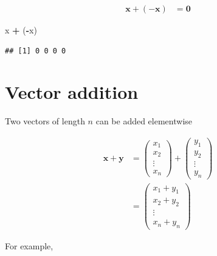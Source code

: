 \documentclass[
]{book}
\newenvironment{Shaded}{\begin{snugshade}}{\end{snugshade}}
\newcommand{\NormalTok}[1]{#1}
\newcommand{\OperatorTok}[1]{\textcolor[rgb]{0.81,0.36,0.00}{\textbf{#1}}}
\newcommand{\StringTok}[1]{\textcolor[rgb]{0.31,0.60,0.02}{#1}}
\theoremstyle{definition}
\theoremstyle{definition}
\theoremstyle{definition}
\theoremstyle{definition}
\theoremstyle{remark}
\begin{document}
\[
\begin{aligned}
\mathbf{x} + (- \mathbf{x}) & = \mathbf{0}
\end{aligned}
\]

\begin{Shaded}
\begin{Highlighting}[]
\NormalTok{x }\OperatorTok{+}\StringTok{ }\NormalTok{(}\OperatorTok{-}\NormalTok{x)}
\end{Highlighting}
\end{Shaded}

\begin{verbatim}
## [1] 0 0 0 0
\end{verbatim}

\hypertarget{vector-addition}{%
\section{Vector addition}\label{vector-addition}}

Two vectors of length \(n\) can be added elementwise

\[
\begin{aligned}
\mathbf{x} + \mathbf{y} & = \begin{pmatrix} x_1 \\ x_2 \\ \vdots \\ x_n \end{pmatrix} + \begin{pmatrix} y_1 \\ y_2 \\ \vdots \\ y_n \end{pmatrix} \\
& = \begin{pmatrix} x_1 + y_1 \\ x_2 + y_2 \\ \vdots \\ x_n + y_n \end{pmatrix} 
\end{aligned}
\]

For example,
\end{document}
